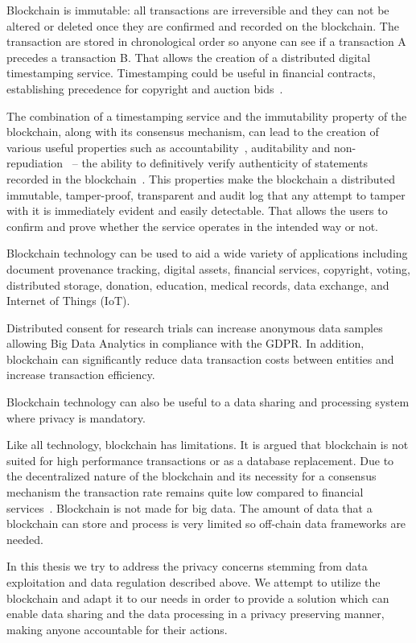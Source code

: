 Blockchain is immutable: all transactions are irreversible and they can not be altered or deleted once they are confirmed and recorded on the blockchain. The transaction are stored in chronological order so anyone can see if a transaction A precedes a transaction B. That allows the creation of a distributed digital timestamping service. Timestamping could be useful in financial contracts, establishing precedence for copyright and auction bids~\cite{bl_auditability}.

The combination of a timestamping service and the immutability property of the blockchain, along with its consensus mechanism, can lead to the creation of various useful properties such as accountability~\cite{10.1007/978-3-540-46588-1_20}, auditability and non-repudiation~\cite{non_repudiation} -- the ability
to definitively verify authenticity of statements recorded in the blockchain~\cite{bl_auditability}. This properties make the blockchain a distributed immutable, tamper-proof, transparent and audit log that any attempt to tamper with it is immediately evident and easily detectable. That allows the users to confirm and prove whether the service operates in the intended way or not.

Blockchain technology can be used to aid a wide variety of applications including document provenance tracking, digital assets, financial services, copyright, voting, distributed storage, donation, education, medical records, data exchange, and Internet of Things (IoT).

Distributed consent for research trials can increase anonymous data samples~\cite{ibm} allowing Big Data Analytics in compliance with the GDPR. In addition, blockchain can significantly reduce data transaction costs between entities and increase transaction efficiency.

Blockchain technology can also be useful to a data sharing and processing system where privacy is mandatory.

Like all technology, blockchain has limitations. It is argued that blockchain is not suited for high performance transactions or as a database replacement. Due to the decentralized nature of the blockchain and its necessity for a consensus mechanism the transaction rate remains quite low compared to financial services~\cite{Sompolinsky2015, Zohar:2015:BUH:2817191.2701411}. Blockchain is not made for big data. The amount of data that a blockchain can store and process is very limited so off-chain data frameworks are needed.

In this thesis we try to address the privacy concerns stemming from data exploitation and data regulation described above. We attempt to utilize the blockchain and adapt it to our needs in order to provide a solution which can enable data sharing and the data processing in a privacy preserving manner, making anyone accountable for their actions.
